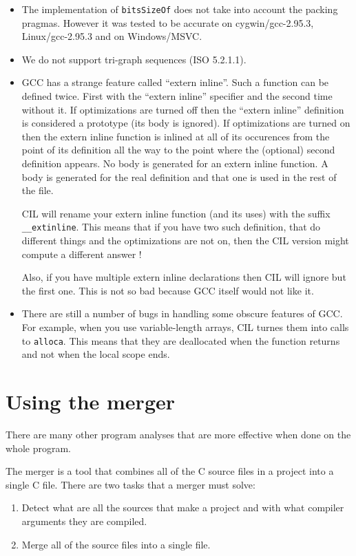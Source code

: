 \documentclass{article}
\def\t#1{{\tt #1}}
\begin{document}
\begin{itemize}

\item The implementation of \t{bitsSizeOf} does not take into account the
packing pragmas. However it was tested to be accurate on cygwin/gcc-2.95.3,
Linux/gcc-2.95.3 and on Windows/MSVC.

\item We do not support tri-graph sequences (ISO 5.2.1.1).

\item GCC has a strange feature called ``extern inline''. Such a function can
be defined twice. First with the ``extern inline'' specifier and the second
time without it. If optimizations are turned off then the ``extern inline''
definition is considered a prototype (its body is ignored). If optimizations
are turned on then the extern inline function is inlined at all of its
occurences from the point of its definition all the way to the point where the
(optional) second definition appears. No body is generated for an extern
inline function. A body is generated for the real definition and that one is
used in the rest of the file. 

 CIL will rename your extern inline function (and its uses) with the suffix
 \t{\_\_extinline}. This means that if you have two such definition, that do
 different things and the optimizations are not on, then the CIL version might
 compute a different answer !

 Also, if you have multiple extern inline declarations then CIL will ignore
but the first one. This is not so bad because GCC itself would not like it. 

\item There are still a number of bugs in handling some obscure features of
GCC. For example, when you use variable-length arrays, CIL turnes them into
calls to \t{alloca}. This means that they are deallocated when the function
returns and not when the local scope ends. 
\end{itemize}

  \section{Using the merger}\label{sec-merger}

 There are many other program analyses that are more effective when
done on the whole program.

 The merger is a tool that combines all of the C source files in a project
into a single C file. There are two tasks that a merger must solve:
\begin{enumerate}
\item Detect what are all the sources that make a project and with what
compiler arguments they are compiled.

\item Merge all of the source files into a single file. 
\end{enumerate}
\end{document}
